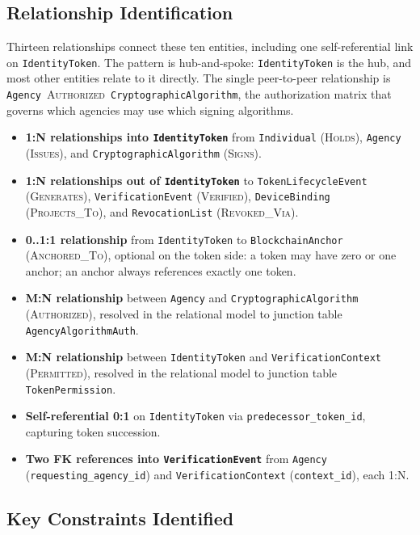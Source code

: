 \documentclass[11pt,letterpaper]{article}
\newcommand{\entity}[1]{\texttt{\color{navydark}#1}}
\begin{document}
\subsection{Relationship Identification}
\label{subsec:relationship-id}

Thirteen relationships connect these ten entities, including one self-referential link on \entity{IdentityToken}. The pattern is hub-and-spoke: \entity{IdentityToken} is the hub, and most other entities relate to it directly. The single peer-to-peer relationship is \entity{Agency}~\textsc{Authorized}~\entity{CryptographicAlgorithm}, the authorization matrix that governs which agencies may use which signing algorithms.

\begin{itemize}
  \item \textbf{1:N relationships into \entity{IdentityToken}} from \entity{Individual} (\textsc{Holds}), \entity{Agency} (\textsc{Issues}), and \entity{CryptographicAlgorithm} (\textsc{Signs}).
  \item \textbf{1:N relationships out of \entity{IdentityToken}} to \entity{TokenLifecycleEvent} (\textsc{Generates}), \entity{VerificationEvent} (\textsc{Verified}), \entity{DeviceBinding} (\textsc{Projects\_To}), and \entity{RevocationList} (\textsc{Revoked\_Via}).
  \item \textbf{0..1:1 relationship} from \entity{IdentityToken} to \entity{BlockchainAnchor} (\textsc{Anchored\_To}), optional on the token side: a token may have zero or one anchor; an anchor always references exactly one token.
  \item \textbf{M:N relationship} between \entity{Agency} and \entity{CryptographicAlgorithm} (\textsc{Authorized}), resolved in the relational model to junction table \entity{AgencyAlgorithmAuth}.
  \item \textbf{M:N relationship} between \entity{IdentityToken} and \entity{VerificationContext} (\textsc{Permitted}), resolved in the relational model to junction table \entity{TokenPermission}.
  \item \textbf{Self-referential 0:1} on \entity{IdentityToken} via \texttt{predecessor\_token\_id}, capturing token succession.
  \item \textbf{Two FK references into \entity{VerificationEvent}} from \entity{Agency} (\texttt{requesting\_agency\_id}) and \entity{VerificationContext} (\texttt{context\_id}), each 1:N.
\end{itemize}

\subsection{Key Constraints Identified}
\label{subsec:key-constraints}
\end{document}
